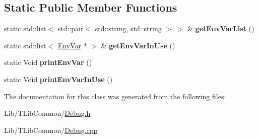 \subsection*{Static Public Member Functions}
\begin{DoxyCompactItemize}
\item 
\mbox{\label{class_env_var_a3a7189a88899dca2fb0f86ed9ad704de}} 
static std\+::list$<$ std\+::pair$<$ std\+::string, std\+::string $>$ $>$ \& {\bfseries get\+Env\+Var\+List} ()
\item 
\mbox{\label{class_env_var_a455283723f3b43d59e343d6eb0d9b3a1}} 
static std\+::list$<$ \hyperlink{class_env_var}{Env\+Var} $\ast$ $>$ \& {\bfseries get\+Env\+Var\+In\+Use} ()
\item 
\mbox{\label{class_env_var_a6e5575ec4bf81f2464b0c56aa49dafb9}} 
static Void {\bfseries print\+Env\+Var} ()
\item 
\mbox{\label{class_env_var_a9a4f697f1462d1ed8d5f1ff603932f93}} 
static Void {\bfseries print\+Env\+Var\+In\+Use} ()
\end{DoxyCompactItemize}


The documentation for this class was generated from the following files\+:\begin{DoxyCompactItemize}
\item 
Lib/\+T\+Lib\+Common/\hyperlink{_debug_8h}{Debug.\+h}\item 
Lib/\+T\+Lib\+Common/\hyperlink{_debug_8cpp}{Debug.\+cpp}\end{DoxyCompactItemize}
